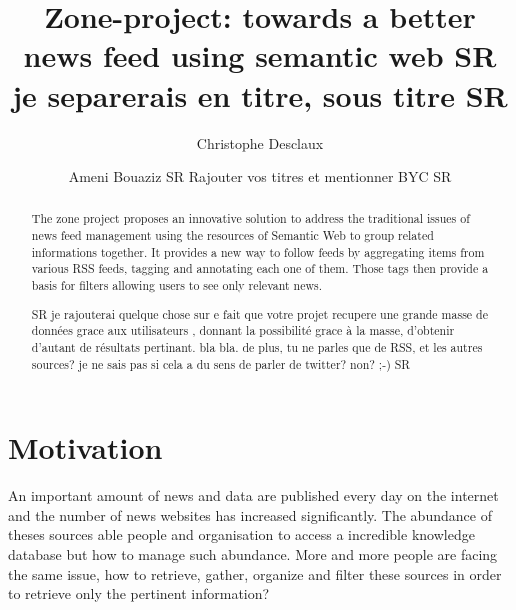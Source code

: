\documentclass{llncs}
\begin{document}
%
\frontmatter          %
%
\pagestyle{headings}  %
%

\mainmatter              %
%
\title{Zone-project: towards a better news feed using semantic web SR je separerais en titre, sous titre SR}
%
%
\author{Christophe Desclaux\and Ameni Bouaziz   SR Rajouter vos titres et mentionner BYC SR}
%
%
%

\maketitle

\begin{abstract}%
The zone project proposes an innovative solution to address the traditional issues of news feed management using the resources of Semantic Web to group related informations together.
It provides a new way to follow feeds by aggregating items from various RSS feeds, tagging and annotating each one of them. Those tags then provide a basis for filters allowing users to see only relevant news.

SR 
je rajouterai quelque chose sur e fait que votre projet recupere une grande masse de données grace aux utilisateurs , donnant la possibilité grace à la masse, d'obtenir d'autant de résultats pertinant. bla bla.
de plus, tu ne parles que de RSS, et les autres sources? je ne sais pas si cela a du sens de parler de twitter? non? ;-) 
SR

{}
\end{abstract}
%
\section{Motivation}
%
An important amount of news and data are published every day on the internet and the number of news websites has increased significantly. The abundance of theses sources able people and organisation to access a incredible knowledge database but how to manage such abundance. More and more people are facing the same issue, how to retrieve, gather, organize and filter these sources in order to retrieve only the pertinent information?
\end{document}
